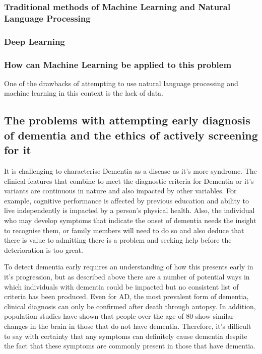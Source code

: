 \documentclass{article}
\begin{document}
\subsubsection{Traditional methods of Machine Learning and Natural Language Processing}

\subsubsection{Deep Learning}

\subsubsection{How can Machine Learning be applied to this problem}
One of the drawbacks of attempting to use natural language processing and machine learning in this context is the lack of data.


\subsection{The problems with attempting early diagnosis of dementia and the ethics of actively screening for it}
It is challenging to characterise Dementia as a disease as it's more syndrome. The clinical features that combine to meet the diagnostic criteria for Dementia or it's variants are continuous in nature and also impacted by other variables. For example, cognitive performance is affected by previous education and ability to live independently is impacted by a person's physical health. Also, the individual who may develop symptoms that indicate the onset of dementia needs the insight to recognise them, or family members will need to do so and also deduce that there is value to admitting there is a problem and seeking help before the deterioration is too great. \newline
\par
To detect dementia early requires an understanding of how this presents early in it's progression, but as described above there are a number of potential ways in which individuals with dementia could be impacted but no consistent list of criteria has been produced. Even for AD, the most prevalent form of dementia, clinical diagnosis can only be confirmed after death through autopsy. In addition, population studies have shown that people over the age of 80 show similar changes in the brain in those that do not have dementia. Therefore, it's difficult to say with certainty that any symptoms can definitely cause dementia despite the fact that these symptoms are commonly present in those that have dementia. \newline
\par
\end{document}
